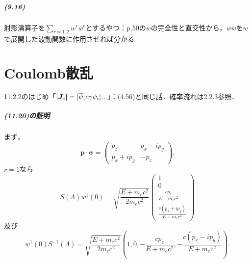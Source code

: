 \paragraph{(9.16)}
射影演算子を$\sum_{r=1,2}w^r\overline{w}^r$とするやつ：p.50の$w$の完全性と直交性から，$w\overline{w}$を$w$で展開した波動関数に作用させれば分かる


\setcounter{chapter}{10}
\chapter{Coulomb散乱}

11.2.2のはじめ「$\lvert\boldsymbol{J}_i\boldsymbol\lvert=\lvert\overline{\psi}_ic\gamma\psi_i\rvert$...」：(4.56)と同じ話．確率流れは2.2.3参照．

\paragraph{(11.20)の証明}
まず，
\[\boldsymbol{p}\cdot\boldsymbol\sigma=
\begin{pmatrix}
  p_z & p_x - ip_y\\
  p_x + ip_y &  - p_z
\end{pmatrix}
.\]
$r=1$なら
\[S(\Lambda)w^1(0)=\sqrt{\frac{E + m_ec^2}{2m_ec^2}}
\begin{pmatrix}
  1\\
  0\\
  \frac{cp_z}{E + m_ec^2}\\
  \frac{c(p_x + ip_y)}{E + m_ec^2}
\end{pmatrix}
\]
及び
\[\overline{w}^1(0)S^{ - 1}(\Lambda)=\sqrt{\frac{E + m_ec^2}{2m_ec^2}}\left(1,0, - \frac{cp_z}{E + m_ec^2}, - \frac{c(p_x - ip_y)}{E + m_ec^2}\right). \]

